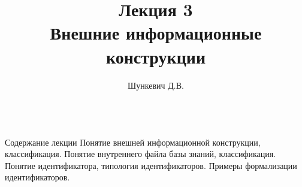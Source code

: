 \title{Лекция 3\\Внешние информационные конструкции}   
\author[]{Шункевич Д.В.}

\begin{frame}
	\titlepage
\end{frame}

\begin{frame}{\\Содержание лекции}
	\topline
	\justifying
	Понятие внешней информационной конструкции, классификация. Понятие внутреннего файла базы знаний, классификация. Понятие идентификатора, типология идентификаторов. Примеры формализации идентификаторов.
\end{frame}